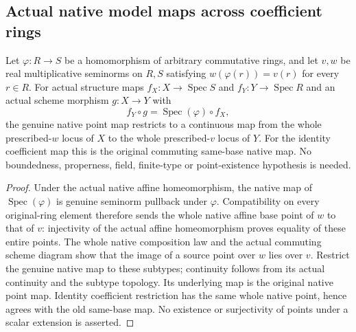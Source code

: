 \subsection{Actual native model maps across coefficient rings}
\label{subsec:native-model-base-change}

\begin{theorem}
\label{scheme:native-coefficient-restriction}
\leanok
{}
Let $\varphi:R\to S$ be a homomorphism of arbitrary commutative rings,
and let $v,w$ be real multiplicative seminorms on $R,S$ satisfying
$w(\varphi(r))=v(r)$ for every $r\in R$. For actual structure maps
$f_X:X\to\operatorname{Spec}S$ and
$f_Y:Y\to\operatorname{Spec}R$ and an actual scheme morphism $g:X\to Y$
with
\[
 f_Y\circ g=\operatorname{Spec}(\varphi)\circ f_X,
\]
the genuine native point map restricts to a continuous map from the
whole prescribed-$w$ locus of $X$ to the whole prescribed-$v$ locus of
$Y$. For the identity coefficient map this is the original commuting
same-base native map. No boundedness, properness, field, finite-type or
point-existence hypothesis is needed.
\end{theorem}
\begin{proof}
Under the actual native affine homeomorphism, the native map of
$\operatorname{Spec}(\varphi)$ is genuine seminorm pullback under
$\varphi$. Compatibility on every original-ring element therefore sends
the whole native affine base point of $w$ to that of $v$: injectivity of
the actual affine homeomorphism proves equality of these entire points.
The whole native composition law and the actual commuting scheme
diagram show that the image of a source point over $w$ lies over $v$.
Restrict the genuine native map to these subtypes; continuity follows
from its actual continuity and the subtype topology. Its underlying map
is the original native point map. Identity coefficient restriction has
the same whole native point, hence agrees with the old same-base map.
No existence or surjectivity of points under a scalar extension is
asserted.
\end{proof}

